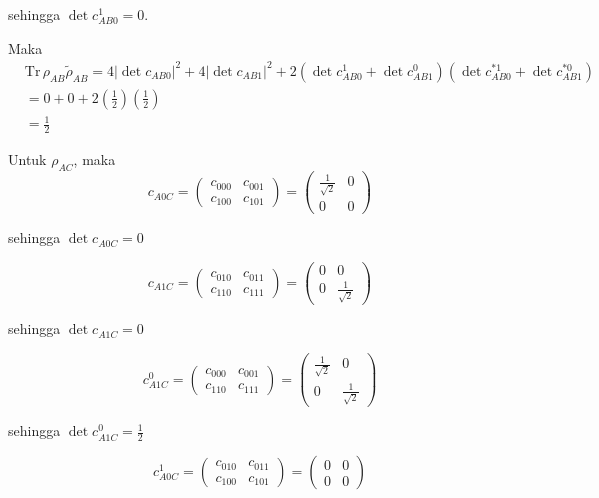 sehingga $\det c_{AB0}^1 = 0$.

Maka
\begin{equation}
	\begin{aligned}
		&\mathrm{Tr}\,\rho_{AB}\tilde{\rho}_{AB}=4 |\det c_{AB0}|^2+ 4 |\det c_{AB1}|^2+ 2 (\det c_{AB0}^1 + \det c_{AB1}^0)(\det c^{*1}_{AB0} + \det c^{*0}_{AB1})\\
		&=0+0+2(\frac{1}{2})(\frac{1}{2})\\
		&=\frac{1}{2}
	\end{aligned}
\end{equation}

Untuk $\rho_{AC}$, maka
\begin{equation}
	c_{A0C}=
	\begin{pmatrix}
		c_{000} & c_{001} \\
		c_{100} & c_{101}
	\end{pmatrix}=
	\begin{pmatrix}
		\frac{1}{\sqrt{2}} & 0 \\
		0 & 0
	\end{pmatrix}
\end{equation}

sehingga $\det c_{A0C} = 0$

\begin{equation}
	c_{A1C}=
	\begin{pmatrix}
		c_{010} & c_{011} \\
		c_{110} & c_{111}
	\end{pmatrix}=
	\begin{pmatrix}
		0 & 0 \\
		0 & \frac{1}{\sqrt{2}}
	\end{pmatrix}
\end{equation}

sehingga $\det c_{A1C} = 0$

\begin{equation}
	c_{A1C}^0=
	\begin{pmatrix}
		c_{000} & c_{001} \\
		c_{110} & c_{111}
	\end{pmatrix}=
	\begin{pmatrix}
		\frac{1}{\sqrt{2}} & 0 \\
		0 & \frac{1}{\sqrt{2}}
	\end{pmatrix}
\end{equation}

sehingga $\det c_{A1C}^0 = \frac{1}{2}$

\begin{equation}
	c_{A0C}^1=
	\begin{pmatrix}
		c_{010} & c_{011} \\
		c_{100} & c_{101}
	\end{pmatrix}=
	\begin{pmatrix}
		0 & 0 \\
		0 & 0
	\end{pmatrix}
\end{equation}

